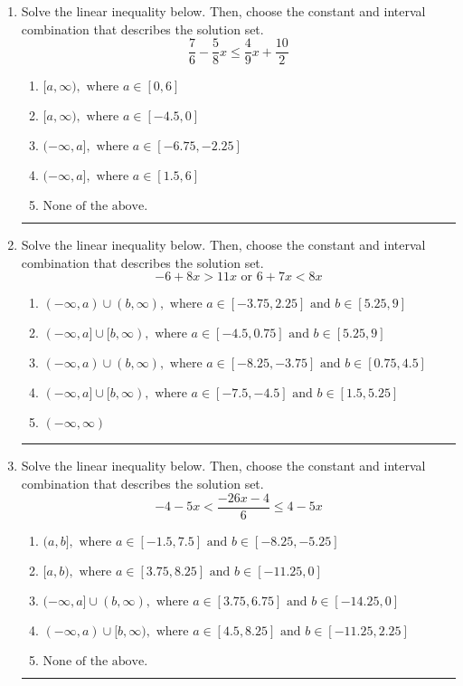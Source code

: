 \documentclass[14pt]{extbook}
\newcommand{\litem}[1]{\item#1\hspace*{-1cm}\rule{\textwidth}{0.4pt}}
\begin{document}
\begin{enumerate}
\litem{
Solve the linear inequality below. Then, choose the constant and interval combination that describes the solution set.\[ \frac{7}{6} - \frac{5}{8} x \leq \frac{4}{9} x + \frac{10}{2} \]\begin{enumerate}[label=\Alph*.]
\item \( [a, \infty), \text{ where } a \in [0, 6] \)
\item \( [a, \infty), \text{ where } a \in [-4.5, 0] \)
\item \( (-\infty, a], \text{ where } a \in [-6.75, -2.25] \)
\item \( (-\infty, a], \text{ where } a \in [1.5, 6] \)
\item \( \text{None of the above}. \)

\end{enumerate} }
\litem{
Solve the linear inequality below. Then, choose the constant and interval combination that describes the solution set.\[ -6 + 8 x > 11 x \text{ or } 6 + 7 x < 8 x \]\begin{enumerate}[label=\Alph*.]
\item \( (-\infty, a) \cup (b, \infty), \text{ where } a \in [-3.75, 2.25] \text{ and } b \in [5.25, 9] \)
\item \( (-\infty, a] \cup [b, \infty), \text{ where } a \in [-4.5, 0.75] \text{ and } b \in [5.25, 9] \)
\item \( (-\infty, a) \cup (b, \infty), \text{ where } a \in [-8.25, -3.75] \text{ and } b \in [0.75, 4.5] \)
\item \( (-\infty, a] \cup [b, \infty), \text{ where } a \in [-7.5, -4.5] \text{ and } b \in [1.5, 5.25] \)
\item \( (-\infty, \infty) \)

\end{enumerate} }
\litem{
Solve the linear inequality below. Then, choose the constant and interval combination that describes the solution set.\[ -4 - 5 x < \frac{-26 x - 4}{6} \leq 4 - 5 x \]\begin{enumerate}[label=\Alph*.]
\item \( (a, b], \text{ where } a \in [-1.5, 7.5] \text{ and } b \in [-8.25, -5.25] \)
\item \( [a, b), \text{ where } a \in [3.75, 8.25] \text{ and } b \in [-11.25, 0] \)
\item \( (-\infty, a] \cup (b, \infty), \text{ where } a \in [3.75, 6.75] \text{ and } b \in [-14.25, 0] \)
\item \( (-\infty, a) \cup [b, \infty), \text{ where } a \in [4.5, 8.25] \text{ and } b \in [-11.25, 2.25] \)
\item \( \text{None of the above.} \)


\end{enumerate}}
\end{enumerate}
\end{document}
